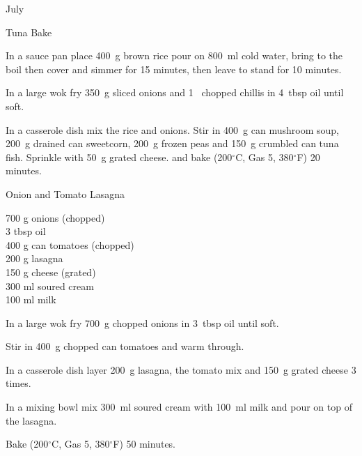 \begin{menu}{July}
\begin{recipe}{2}{Tuna Bake}
\begin{ingredients}
		\end{ingredients}
	
    \begin{instructions}
    \item 
      In a
      sauce pan
      place
      400~g  brown rice
      pour on
      800~ml  cold water,
      bring to the boil then cover and simmer for 15 minutes,
      then leave to stand for 10 minutes.
    \item 
        In a large wok fry
        350~g sliced onions
        and
        1~ chopped chillis
        in
        4~tbsp  oil
        until soft.
      \item 
        In a casserole dish mix
        the rice and onions.
        Stir in
        400~g  can mushroom soup,
        200~g drained can sweetcorn,
        200~g  frozen peas
        and
        150~g crumbled can tuna fish.
        Sprinkle with
        50~g grated cheese.
        and
        bake (200$^{\circ}$C, Gas 5, 380$^{\circ}$F) 20 minutes.
      
    \end{instructions}
    \end{recipe}%
  
    \begin{recipe}{2}{Onion and Tomato Lasagna}%
		\begin{ingredients}
		700 g onions (chopped) \\
	3 tbsp oil  \\
	400 g can tomatoes (chopped) \\
	200 g lasagna  \\
	150 g cheese (grated) \\
	300 ml soured cream  \\
	100 ml milk  \\
	
		\end{ingredients}
	
	
    \begin{instructions}
    \item 
        In a large wok fry
        700~g chopped onions
        in
        3~tbsp  oil
        until soft.
      \item 
        Stir in 400~g chopped can tomatoes
        and warm through.
      \item 
        In a casserole dish layer
        200~g  lasagna,
        the tomato mix and
        150~g grated cheese
        3 times.
      \item 
        In a mixing bowl mix
        300~ml  soured cream
        with
        100~ml  milk
        and pour on top of the lasagna.
      \item 
        Bake (200$^{\circ}$C, Gas 5, 380$^{\circ}$F) 50 minutes.
      

\end{instructions}
\end{recipe}
\end{menu}
